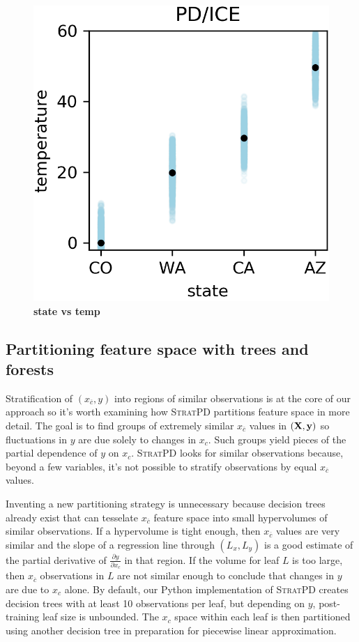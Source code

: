 \documentclass[12pt]{article}
\newcommand{\spd}{\fontfamily{cmr}\textsc{\small StratPD}}
\newcommand{\xnc}{$x_{\overline{c}}$}
\begin{document}
\begin{figure}[htbp]
\begin{center}
\includegraphics[scale=0.7]{images/state_vs_temp_pdp.png}
\caption{{\bf  state  vs temp}}
\label{fig:state_vs_temp}
\end{center}
\end{figure}

\subsection{Partitioning feature space with trees and forests}

Stratification of $(x_{\overline{c}}, y)$ into regions of similar observations is at the core of our approach so it's worth examining how \spd{} partitions feature space in more detail.  The goal is to find groups of extremely similar \xnc{} values in $({\bf X}, {\bf y})$ so fluctuations in $y$ are due solely to changes in $x_c$. Such groups yield pieces of the partial dependence of $y$ on $x_c$. \spd{} looks for similar observations because, beyond a few variables, it's not possible to stratify observations by equal \xnc{} values. 

Inventing a new partitioning strategy is unnecessary because decision trees already exist that can tesselate \xnc{} feature space into small hypervolumes of similar observations. If a hypervolume is tight enough, then \xnc{} values are very similar and the slope of a regression line through $(L_x, L_y)$ is a good estimate of the partial derivative of $\frac{\partial y}{\partial x_{c}}$ in that region.  If the volume for leaf $L$ is too large, then \xnc{} observations in $L$ are not similar enough to conclude that changes in $y$ are due to $x_c$ alone. By default, our Python implementation of \spd{} creates decision trees with at least 10 observations per leaf, but depending on $y$, post-training leaf size is unbounded. The $x_c$ space within each leaf is then partitioned using another decision tree in preparation for piecewise linear approximation.
\end{document}

